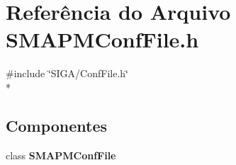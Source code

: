 \section{Referência do Arquivo S\+M\+A\+P\+M\+Conf\+File.\+h}
\label{_s_m_a_p_m_conf_file_8h}
{\ttfamily \#include \char`\"{}S\+I\+G\+A/\+Conf\+File.\+h\char`\"{}}\\*
\subsection*{Componentes}
\begin{DoxyCompactItemize}
\item 
class {\bf S\+M\+A\+P\+M\+Conf\+File}
\end{DoxyCompactItemize}
